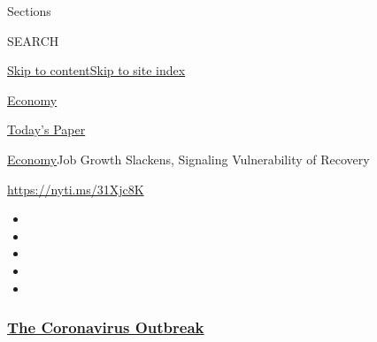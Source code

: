 Sections

SEARCH

\protect\hyperlink{site-content}{Skip to
content}\protect\hyperlink{site-index}{Skip to site index}

\href{https://www.nytimes3xbfgragh.onion/section/business/economy}{Economy}

\href{https://myaccount.nytimes3xbfgragh.onion/auth/login?response_type=cookie\&client_id=vi}{}

\href{https://www.nytimes3xbfgragh.onion/section/todayspaper}{Today's
Paper}

\href{/section/business/economy}{Economy}\textbar{}Job Growth Slackens,
Signaling Vulnerability of Recovery

\url{https://nyti.ms/31Xjc8K}

\begin{itemize}
\item
\item
\item
\item
\item
\end{itemize}

\hypertarget{the-coronavirus-outbreak}{%
\subsubsection{\texorpdfstring{\href{https://www.nytimes3xbfgragh.onion/news-event/coronavirus?name=styln-coronavirus-markets\&region=TOP_BANNER\&block=storyline_menu_recirc\&action=click\&pgtype=Article\&impression_id=3ef949b0-f4c9-11ea-8e77-775acd3382e0\&variant=undefined}{The
Coronavirus
Outbreak}}{The Coronavirus Outbreak}}\label{the-coronavirus-outbreak}}

